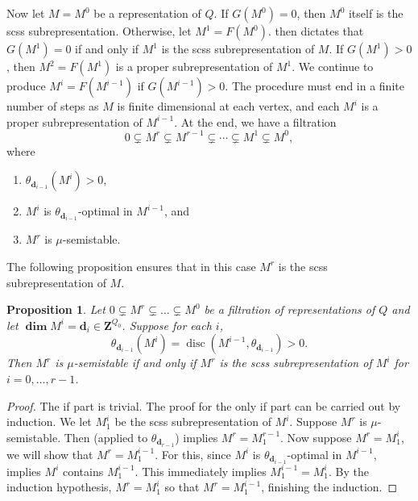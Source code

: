\documentclass[a4paper]{amsart}
\numberwithin{equation}{section}
\theoremstyle{plain}
\newtheorem{proposition}[theorem]{Proposition}
\theoremstyle{definition}
\DeclareMathOperator{\disc}{disc}
\begin{document}
Now let $M=M^0$ be a representation of $Q$. If $G(M^0)=0$, then $M^0$ itself is the scss subrepresentation. Otherwise, let $M^1=F(M^0)$.  then dictates that $G(M^1)=0$ if and only if $M^1$ is the scss subrepresentation of $M$. If $G(M^1)>0$, then $M^2=F(M^1)$ is a proper subrepresentation of $M^1$. We continue to produce $M^i=F(M^{i-1})$ if $G(M^{i-1})>0$. The procedure must end in a finite number of steps as $M$ is finite dimensional at each vertex, and each $M^{i}$ is a proper subrepresentation of $M^{i-1}$. At the end, we have a filtration $$0\subsetneq M^r\subsetneq M^{r-1}\subsetneq\cdots\subsetneq M^1\subsetneq M^0,$$ where 
\begin{enumerate}
    \item $\theta_{\mathbf{d}_{i-1}}(M^i)>0$,
    \item $M^{i}$ is $\theta_{\mathbf{d}_{i-1}}$-optimal in $M^{i-1}$, and 
    \item $M^{r}$ is $\mu$-semistable.
\end{enumerate}

The following proposition ensures that in this case $M^r$ is the scss subrepresentation of $M$. 

\begin{proposition}\label{Algorithm_produces_M1}
Let $0\subsetneq M^{r}\subsetneq\ldots\subsetneq M^{0}$ be a filtration of representations of $Q$ and let $\pmb{\dim}M^{i}=\mathbf{d}_{i}\in\mathbf{Z}^{Q_{0}}$. Suppose for each $i$, $$\theta_{\mathbf{d}_{i-1}}(M^{i})=\disc(M^{i-1},\theta_{\mathbf{d}_{i-1}})>0.$$  
Then $M^{r}$ is $\mu$-semistable if and only if $M^{r}$ is the scss subrepresentation of $M^{i}$ for $i=0,\ldots,r-1$.
\end{proposition}

\begin{proof}
The if part is trivial. The proof for the only if part can be carried out by induction. We let $M_1^{i}$ be the scss subrepresentation of $M^i$. Suppose $M^{r}$ is $\mu$-semistable. Then  (applied to $\theta_{\mathbf{d}_{r-1}}$) implies $M^{r}=M^{r-1}_1$.  Now suppose $M^{r}=M^{i}_1$, we will show that $M^{r}=M^{i-1}_1$. For this, since $M^{i}$ is $\theta_{\mathbf{d}_{i-1}}$-optimal in $M^{i-1}$,  implies $M^{i}$ contains $M^{i-1}_{1}$. This immediately implies $M^{i-1}_1=M^{i}_1$.  By the induction hypothesis, $M^r = M^{i}_1$ so that $M^{r}=M^{i-1}_{1}$, finishing the induction.
\end{proof}
\end{document}
